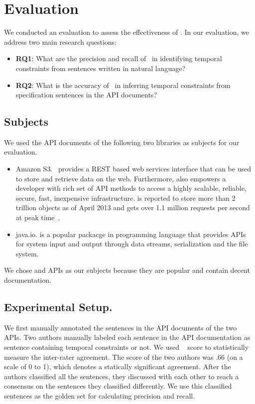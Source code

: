\section{Evaluation}
\label{sec:evaluation}

We conducted an evaluation to assess the effectiveness of \tool. In our evaluation, we address two main research questions:

\begin{itemize}
	\item\textbf{RQ1}: What are the precision and recall of \tool\  in
	identifying temporal constraints from sentences written in natural language?
	\item\textbf{RQ2}: What is the accuracy of \tool\ in inferring temporal constraints from specification sentences in the API documents? 
\end{itemize}

\subsection{Subjects}
\label{sub:subject}

We used the API documents of the following two libraries as subjects for our evaluation. 
\begin{itemize}
	\item{Amazon S3}. \amazon\ provides a REST based web services interface that can be used to store and retrieve data on the web. Furthermore,  also empowers a developer with rich set of API methods to access a highly scalable, reliable, secure, fast, inexpensive infrastructure.  is reported to store more than 2 trillion objects as of April 2013 and gets over 1.1 million requests per second at peak time~\cite{amazons3stats}.

	\item{java.io}.  is a popular packacge in  programming language that provides APIs for system input and output through data streams, serialization and the file system.
\end{itemize}
We chose  and  APIs as our subjects because they are popular and contain decent documentation.

\subsection{Experimental Setup.} 
We first manually annotated the sentences in the API documents of the two APIs.
Two authors manually labeled each sentence in the API documentation as sentence containing 
temporal constraints or not.
We used ~\cite{carletta1996assessing} score to statistically measure
the inter-rater agreement.
The  score of the two authors was .66 (on a scale of 0 to 1), 
which denotes a statically significant agreement. 
After the authors classified all the sentences, they 
discussed with each other to reach a consensus on the sentences they classified differently. 
We use this classified sentences as the golden set for calculating precision and recall.

